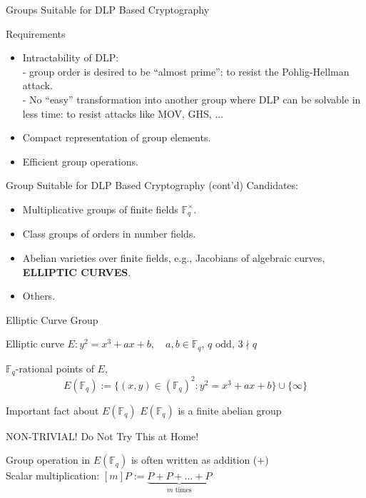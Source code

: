 \documentclass{beamer}
\begin{document}
\begin{frame}{Groups Suitable for DLP Based Cryptography}
\begin{block}{Requirements}
\begin{itemize}
\item Intractability of DLP: \\
    - group order is desired to be ``almost prime'': to resist the
Pohlig-Hellman attack. \\
    - No ``easy'' transformation into another group where DLP can be solvable
in less time: to resist attacks like MOV, GHS, ...
\item Compact representation of group elements.
\item Efficient group operations.
\end{itemize}
\end{block}
\end{frame}

\begin{frame}{Group Suitable for DLP Based Cryptography (cont'd)}
    Candidates:
\begin{itemize}
\item Multiplicative groups of finite fields $\mathbb{F}_q^{\times}$.
\item Class groups of orders in number fields.
\item Abelian varieties over finite fields, e.g., Jacobians of algebraic
curves, {\bf ELLIPTIC CURVES}.
\item Others.
\end{itemize}
\end{frame}

\begin{frame}{Elliptic Curve Group}
\begin{center}
Elliptic curve
{\Large 
$E: y^2 = x^3 + a x + b, \quad a, b\in \mathbb{F}_q$, $q$ odd, $3\nmid q$
}
\end{center}

$\mathbb{F}_q$-rational points of $E$, 
$$E(\mathbb{F}_q) := \{(x, y)\in (\mathbb{F}_q)^2: y^2 = x^3 + a x + b\}\cup 
\{\infty\}$$

\pause
\begin{block}{Important fact about $E(\mathbb{F}_q)$}
$E(\mathbb{F}_q)$ is a finite abelian group

\alert{NON-TRIVIAL! Do Not Try This at Home!}
\end{block}

Group operation in $E(\mathbb{F}_q)$ is often written as addition (+)\\
Scalar multiplication: 
$[m]P :=\underbrace{P + P + \ldots + P}_{m\textrm{ times}}$

\end{frame}
\end{document}
